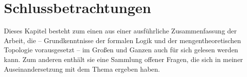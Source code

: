 \chapter{Schlussbetrachtungen}\label{chap:diskussion}
    Dieses Kapitel besteht zum einen aus einer ausführliche Zusammenfassung der Arbeit, die -- Grundkenntnisse der formalen Logik und der mengentheoretischen Topologie vorausgesetzt -- im Großen und Ganzen auch für sich gelesen werden kann.
    Zum anderen enthält sie eine Sammlung offener Fragen, die sich in meiner Auseinandersetzung mit dem Thema ergeben haben.
    
